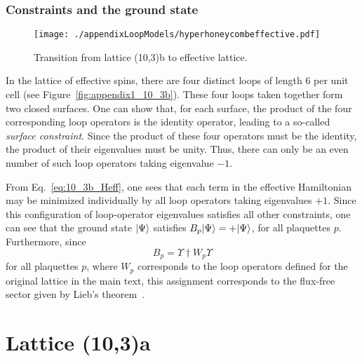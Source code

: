%
%
\subsubsection{Constraints and the ground state}
%
%
%
\begin{figure}[tb]
	\centering
	\texttt{[image: ./appendixLoopModels/hyperhoneycombeffective.pdf]}
	\caption{Transition from lattice (10,3)b to effective lattice.}
	\label{fig:appendix1_HyperhoneycombEffectiveLattice}
\end{figure}
%
In the lattice of effective spins, there are four distinct loops of length 6 per unit cell (see Figure~\ref{fig:appendix1_10_3b}).
These four loops taken together form two closed surfaces.
One can show that, for each surface, the product of the four corresponding loop operators is the identity operator, leading to a so-called {\it surface constraint}.
Since the product of these four operators must be the identity, the product of their eigenvalues must be unity.
Thus, there can only be an even number of such loop operators taking eigenvalue $-1$.

From Eq.~\eqref{eq:10_3b_Heff}, one sees that each term in the effective Hamiltonian may be minimized individually by all loop operators taking eigenvalues $+1$.
Since this configuration of loop-operator eigenvalues satisfies all other constraints, one can see that the ground state $| \Psi \rangle$ satisfies $B_p | \Psi \rangle = + | \Psi \rangle$, for all plaquettes $p$.
Furthermore, since
%
\begin{equation}
	B_p = \Upsilon\dag W_p \Upsilon
\end{equation}
%
for all plaquettes $p$, where $W_p$ corresponds to the loop operators defined for the original lattice in the main text, this assignment corresponds to the flux-free sector given by Lieb's theorem~\cite{LiebHPA1992,LiebDMJ1993,LiebPRL1994}.


%
%
\section{Lattice (10,3)a}
\label{appendix:LoopModels_10_3a}
%
%
